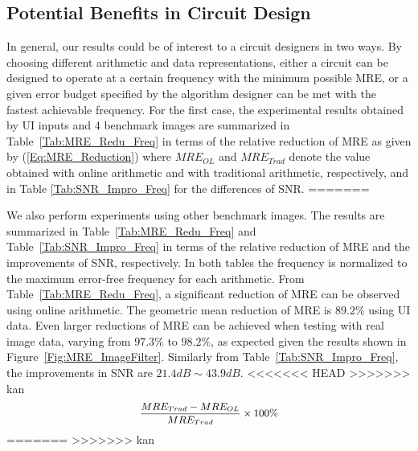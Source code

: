 \documentclass{acm_proc_article-sp}
\begin{document}
\subsection{Potential Benefits in Circuit Design}
In general, our results could be of interest to a circuit designers in two ways. By choosing different arithmetic and data representations, either a circuit can be designed to operate at a certain frequency with the minimum possible MRE, or a given error budget specified by the algorithm designer can be met with the fastest achievable frequency. For the first case, the experimental results obtained by UI inputs and 4 benchmark images are summarized in Table~\ref{Tab:MRE_Redu_Freq} in terms of the relative reduction of MRE as given by (\ref{Eq:MRE_Reduction}) where $MRE_{OL}$ and $MRE_{Trad}$ denote the value obtained with online arithmetic and with traditional arithmetic, respectively, and in Table \ref{Tab:SNR_Impro_Freq} for the differences of SNR.
=======

We also perform experiments using other benchmark images. The results are summarized in Table~\ref{Tab:MRE_Redu_Freq} and Table~\ref{Tab:SNR_Impro_Freq} in terms of the relative reduction of MRE and the improvements of SNR, respectively. In both tables the frequency is normalized to the maximum error-free frequency for each arithmetic. From Table~\ref{Tab:MRE_Redu_Freq}, a significant reduction of MRE can be observed using online arithmetic. The geometric mean reduction of MRE is $89.2\%$ using UI data. Even larger reductions of MRE can be achieved when testing with real image data, varying from $97.3\%$ to $98.2\%$, as expected given the results shown in Figure~\ref{Fig:MRE_ImageFilter}. Similarly from Table~\ref{Tab:SNR_Impro_Freq}, the improvements in SNR are $21.4dB\sim43.9dB$.\vspace{-1ex}
%
<<<<<<< HEAD
>>>>>>> kan
%
\begin{eqnarray}\label{Eq:MRE_Reduction}
\scriptsize
  \frac{MRE_{Trad}-MRE_{OL}}{MRE_{Trad}}\times100\%
\normalsize
\end{eqnarray}
=======
>>>>>>> kan
\end{document}

